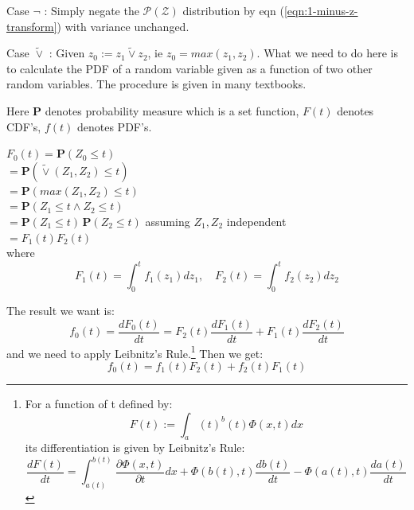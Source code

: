 \documentclass[a4paper]{report}
\begin{document}
Case $\neg$ :  Simply negate the $\mathcal{P(Z)}$ distribution by eqn (\ref{eqn:1-minus-z-transform}) with variance unchanged.

Case $\widetilde{\vee}$ :  Given $z_0 := z_1 \widetilde{\vee} z_2$, ie $z_0 = max(z_1, z_2)$.  What we need to do here is to calculate the PDF of a random variable given as a function of two other random variables.  The procedure is given in many textbooks.

Here $\mathbf{P}$ denotes probability measure which is a set function, $F(t)$ denotes CDF's, $f(t)$ denotes PDF's.


\hspace*{1.2cm} $ F_0(t) = \mathbf{P}(Z_0 \leq t)$\\
\hspace*{2cm} $= \mathbf{P}(\widetilde{\vee}(Z_1,Z_2) \leq t)$\\
\hspace*{2cm} $= \mathbf{P}(max(Z_1,Z_2) \leq t)$\\
\hspace*{2cm} $= \mathbf{P}(Z_1 \leq t \wedge Z_2 \leq t)$\\
\hspace*{2cm} $= \mathbf{P}(Z_1 \leq t) \, \mathbf{P}(Z_2 \leq t)$ \quad assuming $Z_1, Z_2$ independent\\
\hspace*{2cm} $= F_1(t) F_2(t)$\\
where $$ F_1(t) = \int_0^t f_1(z_1) dz_1 , \quad F_2(t) = \int_0^t f_2(z_2) dz_2$$

The result we want is:
\[ f_0(t) = \frac{dF_0(t)}{dt} = F_2(t) \frac{dF_1(t)}{dt} + F_1(t) \frac{dF_2(t)}{dt} \]
and we need to apply Leibnitz's Rule.\footnote{For a function of t defined by: $$ F(t) := \int_a(t)^b(t) \Phi(x,t) dx $$ its differentiation is given by Leibnitz's Rule: $$ \frac{dF(t)}{dt} = \int_{a(t)}^{b(t)} \frac{\partial\Phi(x,t)}{\partial t} dx + \Phi(b(t),t) \frac{db(t)}{dt} - \Phi(a(t),t) \frac{da(t)}{dt} $$ }  Then we get:
\begin{equation}
f_0(t) = f_1(t) F_2(t) + f_2(t) F_1(t)
\end{equation}
\end{document}
